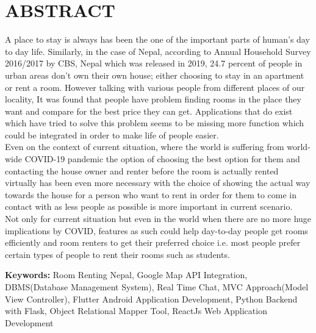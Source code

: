 \setcounter{page}{1}
\chapter*{ABSTRACT}
\thispagestyle{plain} 
A place to stay is always has been the one of the important parts of  human’s day to day life. Similarly, in the case of Nepal, according to Annual Household Survey 2016/2017 by CBS, Nepal \cite{householdsurvey} which was released in 2019, 24.7 percent of people in urban areas don’t own their own house; either choosing to stay in an apartment or rent a room. However talking with various people from different places of our locality, It was found that people have problem finding rooms in the place they want and compare for the best price they can get. Applications that do exist which have tried to solve this problem seems to be missing more function which could be integrated in order to make life of people easier.\\ Even on the context of current situation, where the world is suffering from world-wide COVID-19 pandemic the option of choosing the best option for them and contacting the house owner and renter before the room is actually rented virtually has been even more necessary with the choice of showing the actual way towards the house for a person who want to rent in order for them to come in contact with as less people as possible is more important in current scenario.\\ Not only for current situation but even in the world when there are no more huge implications by COVID, features as such could help day-to-day people get rooms efficiently and room renters to get their preferred choice i.e. most people prefer certain types of people to rent their rooms such as students. 
\par
\textbf{Keywords:} Room Renting Nepal, Google Map API Integration, DBMS(Database Management System), Real Time Chat, MVC Approach(Model View Controller), Flutter Android Application Development, Python Backend with Flask, Object Relational Mapper Tool, ReactJs Web Application Development
\newpage
